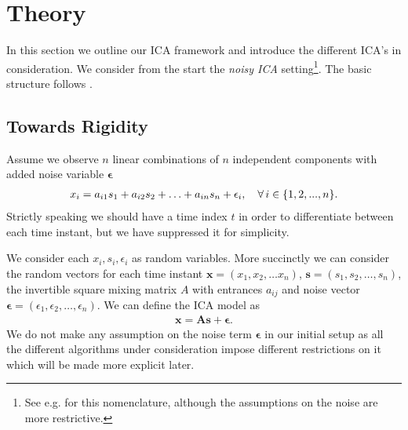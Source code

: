 
\section{Theory}\label{sec:theory}

In this section we outline our ICA framework and introduce the different ICA's in consideration. We consider from the start the \textit{noisy ICA} setting\footnote{See e.g. \cite{hyvarinen2001} for this nomenclature, although the assumptions on the noise are more restrictive.}. The basic structure follows \cite{hyvarinen2000}. 

	\subsection{Towards Rigidity}
	Assume we observe $n$ linear combinations of $n$ independent components with added noise variable $\bm{\epsilon}$
		\begin{align*}
			x_i=a_{i1} s_1 + a_{i2} s_2 +\ldots + a_{in} s_n+\epsilon_i, \quad \forall\, i \in \{1,2,...,n\}.
		\end{align*} 
	Strictly speaking we should have a time index $t$ in order to differentiate between each time instant, but we have suppressed it for simplicity. 

	We consider each $x_i,s_i,\epsilon_i$ as random variables. More succinctly we can consider the random vectors for each time instant $\textbf{x}=(x_1,x_2,\ldots x_n)$, $\textbf{s}=(s_1,s_2,\ldots,s_n)$, the invertible square mixing matrix $A$ with entrances $a_{ij}$ and noise vector $\bm{\epsilon}=(\epsilon_1,\epsilon_2,\ldots,\epsilon_n)$. We can define the ICA model as
		\begin{align*}
			\textbf{x}=\textbf{A}\textbf{s}+\bm{\epsilon}.
		\end{align*} 
	We do not make any assumption on the noise term $\bm{\epsilon}$ in our initial setup as all the different algorithms under consideration impose different restrictions on it which will be made more explicit later.

